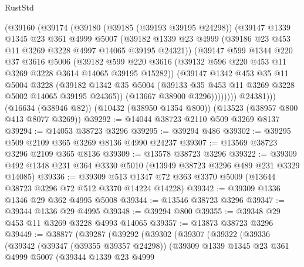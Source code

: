 \begin{lexlean}{RustStd}
\begin{coremodule}
            (@39160
              (@39174
                (@39180
                  (@39185 (@39193 @39195 @24298))
                  (@39147
                    @1339
                    @1345
                    @23
                    @361
                    @4999
                    @5007
                    (@39182
                      @1339
                      @23
                      @4999
                      (@39186 @23 @453 @11 @3269 @3228 @4997 @14065 @39195 @24321))
                    (@39147
                      @599
                      @1344
                      @220
                      @37
                      @3616
                      @5006
                      (@39182
                        @599
                        @220
                        @3616
                        (@39132 @596 @220 @453 @11 @3269 @3228 @3614 @14065 @39195 @15282))
                      (@39147
                        @1342
                        @453
                        @35
                        @11
                        @5004
                        @3228
                        (@39182
                          @1342
                          @35
                          @5004
                          (@39133 @35 @453 @11 @3269 @3228 @5002 @14065 @39195 @24365))
                        (@13667 @38900 @3296))))))))
          @24381)))
    (@16634 (@38946 @82))
    (@10432 (@38950 @1354 @800))
    (@13523 (@38957 @800 @413 @8077 @3269))
@39292 := @14044 @38723 @2110 @509 @3269 @8137
@39294 := @14053 @38723 @3296
@39295 := @39294 @486
@39302 := @39295 @509 @2109 @365 @3269 @8136 @4990 @24237
@39307 := @13569 @38723 @3296 @2109 @365 @8136
@39309 := @13578 @38723 @3296
@39322 := @39309 @492 @1348 @231 @364 @3330 @5010 (@13949 @38723 @3296 @489 @231 @3329 @14085)
@39336 := @39309 @513 @1347 @72 @363 @3370 @5009 (@13644 @38723 @3296 @72 @512 @3370 @14224 @14228)
@39342 := @39309 @1336 @1346 @29 @362 @4995 @5008
@39344 := @13546 @38723 @3296
@39347 := @39344 @1336 @29 @4995
@39348 := @39294 @800
@39355 := @39348 @29 @453 @11 @3269 @3228 @4993 @14065
@39357 := @13873 @38723 @3296
@39449 := @38877
    (@39287
      (@39292
        (@39302
          (@39307
            (@39322
              (@39336
                (@39342
                  (@39347 (@39355 @39357 @24298))
                  (@39309
                    @1339
                    @1345
                    @23
                    @361
                    @4999
                    @5007
                    (@39344
                      @1339
                      @23
                      @4999

\end{coremodule}
\end{lexlean}
